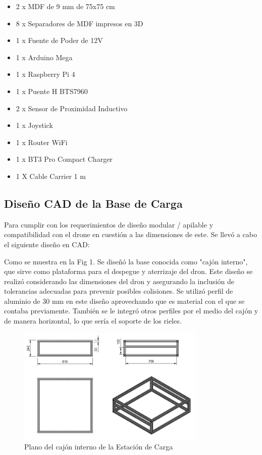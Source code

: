 \begin{itemize}
        \item 2 x MDF de 9 mm de 75x75 cm
        \item 8 x Separadores de MDF impresos en 3D
        \item 1 x Fuente de Poder de 12V
        \item 1 x Arduino Mega
        \item 1 x Raspberry Pi 4
        \item 1 x Puente H BTS7960 
        \item 2 x Sensor de Proximidad Inductivo
        \item 1 x Joystick
        \item 1 x Router WiFi
        \item 1 x BT3 Pro Compact Charger
        \item 1 X Cable Carrier 1 m
    \end{itemize}

\subsection{Diseño CAD de la Base de Carga}

    Para cumplir con los requerimientos de diseño modular / apilable y compatibilidad con el drone en cuestión a las dimensiones de este. Se llevó a cabo el siguiente diseño en CAD:

    Como se muestra en la Fig 1. Se diseñó la base conocida como "cajón interno", que sirve como plataforma para el despegue y aterrizaje del dron. Este diseño se realizó considerando las dimensiones del dron y asegurando la inclusión de tolerancias adecuadas para prevenir posibles colisiones. Se utilizó perfil de aluminio de 30 mm en este diseño aprovechando que es material con el que se contaba previamente. También se le integró otros perfiles por el medio del cajón y de manera horizontal, lo que sería el soporte de los rieles.
            \begin{figure}[htpb]
                \centering
                \includegraphics[width=0.8\textwidth]{pictures/PLANOS_CAJON_INTERNO_1.png}
                \caption{Plano del cajón interno de la Estación de Carga}
                \label{fig:etiqueta}
            \end{figure}
            
